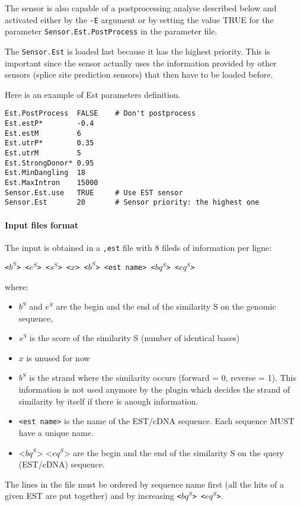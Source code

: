 The sensor is also capable of a postprocessing analyse described below
and activated either by the \texttt{-E} argument or by setting the value
TRUE for the parameter \texttt{Sensor.Est.PostProcess} in the parameter
file.

The \texttt{Sensor.Est} is loaded last because it has the highest priority.
This is important since the sensor actually uses the information
provided by other sensors (splice site prediction sensors) that then have to be loaded before.

Here is an example of Est parameters definition.
\begin{Verbatim}[fontsize=\small]
Est.PostProcess  FALSE    # Don't postprocess
Est.estP*        -0.4
Est.estM         6
Est.utrP*        0.35
Est.utrM         5
Est.StrongDonor* 0.95
Est.MinDangling  18
Est.MaxIntron    15000
Sensor.Est.use   TRUE     # Use EST sensor
Sensor.Est       20       # Sensor priority: the highest one
\end{Verbatim}


\paragraph{Input files format}

The input is obtained in a \texttt{,est} file with 8 fileds of information
per ligne:

\texttt{<$b^S$> <$e^S$> <$s^S$> <$x$> <$b^S$> <est name> <$bq^S$> <$eq^S$>}

where:
\begin{itemize}
\item $b^S$ and $e^S$ are the begin and the end of the similarity S on the genomic sequence,
\item $s^S$ is the score of the similarity S (number of identical bases)
\item $x$ is unused for now
\item $b^S$ is the strand where the similarity occurs (forward = 0,
  reverse = 1). This information is not used anymore by the plugin
  which decides the strand of similarity by itself if there is anough
  information.
\item \texttt{<est name>} is the name of the EST/cDNA sequence. Each
  sequence MUST have a unique name.
\item <$bq^S$> <$eq^S$> are the begin and the end of the similarity S
  on the query (EST/cDNA) sequence.
\end{itemize}
The lines in the file must be ordered by sequence name first (all the
hits of a given EST are put together) and by increasing
\texttt{<$bq^S$> <$eq^S$>}. 

